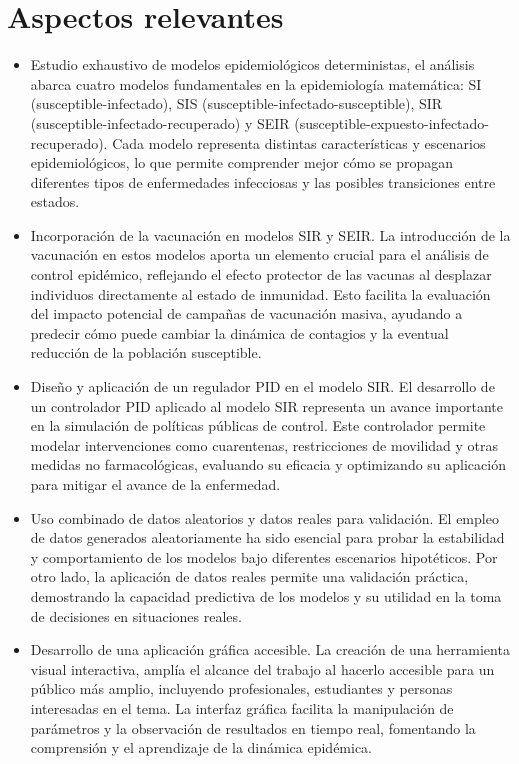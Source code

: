 \section{Aspectos relevantes}
\begin{itemize}
    \item Estudio exhaustivo de modelos epidemiológicos deterministas, el análisis abarca cuatro modelos fundamentales en la epidemiología matemática: SI (susceptible-infectado), SIS (susceptible-infectado-susceptible), SIR (susceptible-infectado-recuperado) y SEIR (susceptible-expuesto-infectado-recuperado). Cada modelo representa distintas características y escenarios epidemiológicos, lo que permite comprender mejor cómo se propagan diferentes tipos de enfermedades infecciosas y las posibles transiciones entre estados.
    \item Incorporación de la vacunación en modelos SIR y SEIR. La introducción de la vacunación en estos modelos aporta un elemento crucial para el análisis de control epidémico, reflejando el efecto protector de las vacunas al desplazar individuos directamente al estado de inmunidad. Esto facilita la evaluación del impacto potencial de campañas de vacunación masiva, ayudando a predecir cómo puede cambiar la dinámica de contagios y la eventual reducción de la población susceptible.
    \item Diseño y aplicación de un regulador PID en el modelo SIR. El desarrollo de un controlador PID aplicado al modelo SIR representa un avance importante en la simulación de políticas públicas de control. Este controlador permite modelar intervenciones como cuarentenas, restricciones de movilidad y otras medidas no farmacológicas, evaluando su eficacia y optimizando su aplicación para mitigar el avance de la enfermedad.
    \item Uso combinado de datos aleatorios y datos reales para validación. El empleo de datos generados aleatoriamente ha sido esencial para probar la estabilidad y comportamiento de los modelos bajo diferentes escenarios hipotéticos. Por otro lado, la aplicación de datos reales permite una validación práctica, demostrando la capacidad predictiva de los modelos y su utilidad en la toma de decisiones en situaciones reales.
    \item Desarrollo de una aplicación gráfica accesible. La creación de una herramienta visual interactiva, amplía el alcance del trabajo al hacerlo accesible para un público más amplio, incluyendo profesionales, estudiantes y personas interesadas en el tema. La interfaz gráfica facilita la manipulación de parámetros y la observación de resultados en tiempo real, fomentando la comprensión y el aprendizaje de la dinámica epidémica.

\end{itemize}
